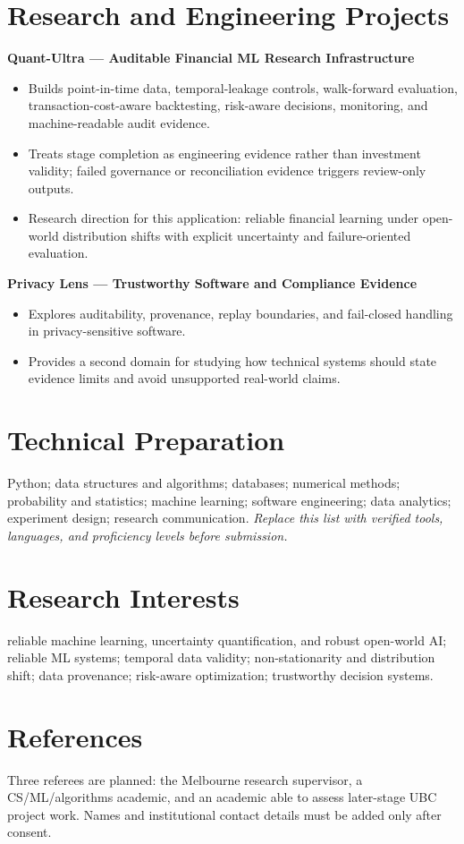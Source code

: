 \documentclass[11pt]{article}
\begin{document}
\section*{Research and Engineering Projects}
\textbf{Quant-Ultra --- Auditable Financial ML Research Infrastructure}
\begin{itemize}
\item Builds point-in-time data, temporal-leakage controls, walk-forward evaluation, transaction-cost-aware backtesting, risk-aware decisions, monitoring, and machine-readable audit evidence.
\item Treats stage completion as engineering evidence rather than investment validity; failed governance or reconciliation evidence triggers review-only outputs.
\item Research direction for this application: reliable financial learning under open-world distribution shifts with explicit uncertainty and failure-oriented evaluation.
\end{itemize}

\begin{samepage}
\textbf{Privacy Lens --- Trustworthy Software and Compliance Evidence}
\begin{itemize}
\item Explores auditability, provenance, replay boundaries, and fail-closed handling in privacy-sensitive software.
\item Provides a second domain for studying how technical systems should state evidence limits and avoid unsupported real-world claims.
\end{itemize}
\end{samepage}

\section*{Technical Preparation}
Python; data structures and algorithms; databases; numerical methods; probability and statistics; machine learning; software engineering; data analytics; experiment design; research communication. \textit{Replace this list with verified tools, languages, and proficiency levels before submission.}

\section*{Research Interests}
reliable machine learning, uncertainty quantification, and robust open-world AI; reliable ML systems; temporal data validity; non-stationarity and distribution shift; data provenance; risk-aware optimization; trustworthy decision systems.

\section*{References}
Three referees are planned: the Melbourne research supervisor, a CS/ML/algorithms academic, and an academic able to assess later-stage UBC project work. Names and institutional contact details must be added only after consent.
\end{document}
